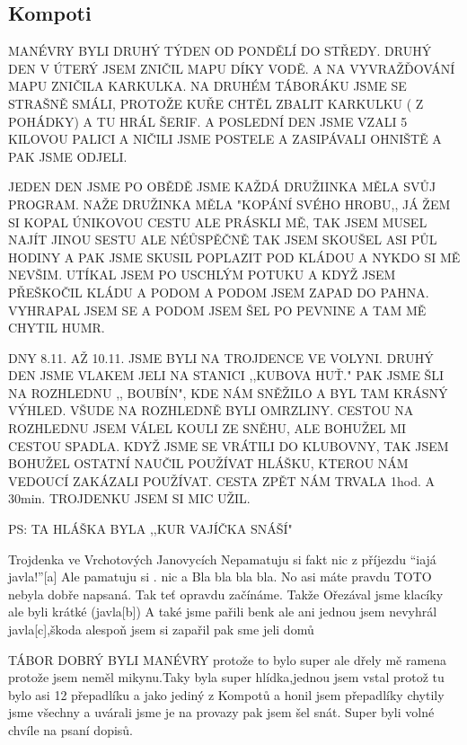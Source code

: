\subsection*{Kompoti} %
\label{sub:kompoti}


\begin{multicols}{2}


MANÉVRY BYLI DRUHÝ TÝDEN OD PONDĚLÍ DO STŘEDY. DRUHÝ DEN V ÚTERÝ JSEM ZNIČIL MAPU DÍKY VODĚ. A NA VYVRAŽĎOVÁNÍ MAPU ZNIČILA KARKULKA. NA DRUHÉM TÁBORÁKU JSME SE STRAŠNĚ SMÁLI, PROTOŽE KUŘE CHTĚL ZBALIT KARKULKU ( Z POHÁDKY) A TU HRÁL ŠERIF. A POSLEDNÍ DEN JSME VZALI 5 KILOVOU PALICI A NIČILI JSME POSTELE A ZASIPÁVALI OHNIŠTĚ A PAK JSME ODJELI.




JEDEN DEN JSME PO OBĚDĚ JSME KAŽDÁ DRUŽIINKA MĚLA SVŮJ PROGRAM. NAŽE DRUŽINKA MĚLA "KOPÁNÍ SVÉHO HROBU,,
JÁ ŽEM SI KOPAL ÚNIKOVOU CESTU ALE PRÁSKLI MĚ, TAK JSEM MUSEL NAJÍT JINOU SESTU ALE NÉŮSPĚČNĚ TAK JSEM SKOUŠEL ASI PŮL HODINY A PAK JSME SKUSIL POPLAZIT POD KLÁDOU A NYKDO SI MĚ NEVŠIM. UTÍKAL JSEM PO USCHLÝM POTUKU A KDYŽ JSEM PŘEŠKOČIL KLÁDU A PODOM A PODOM JSEM ZAPAD DO PAHNA. VYHRAPAL JSEM SE A PODOM JSEM ŠEL PO PEVNINE A TAM MĚ CHYTIL HUMR.




DNY 8.11. AŽ 10.11. JSME BYLI NA TROJDENCE VE VOLYNI. DRUHÝ DEN JSME VLAKEM JELI NA STANICI ,,KUBOVA HUŤ." PAK JSME ŠLI NA ROZHLEDNU ,, BOUBÍN", KDE NÁM SNĚŽILO A BYL TAM KRÁSNÝ VÝHLED. VŠUDE NA ROZHLEDNĚ BYLI OMRZLINY. CESTOU NA ROZHLEDNU JSEM VÁLEL KOULI ZE SNĚHU, ALE BOHUŽEL MI CESTOU SPADLA. KDYŽ JSME SE VRÁTILI DO KLUBOVNY, TAK JSEM BOHUŽEL OSTATNÍ NAUČIL POUŽÍVAT HLÁŠKU, KTEROU NÁM VEDOUCÍ ZAKÁZALI POUŽÍVAT. CESTA ZPĚT NÁM TRVALA 1hod. A 30min. TROJDENKU JSEM SI MIC UŽIL.


PS: TA HLÁŠKA BYLA ,,KUR VAJÍČKA SNÁŠÍ"





Trojdenka ve Vrchotových Janovycích
Nepamatuju si fakt nic z příjezdu “iajá javla!”[a] 
Ale pamatuju si . nic a Bla bla bla bla. No asi máte pravdu TOTO nebyla dobře napsaná. Tak teť opravdu začínáme. Takže Ořezával jsme klacíky ale byli krátké (javla[b]) A také jsme pařili benk ale ani jednou jsem nevyhrál javla[c],škoda alespoň jsem si zapařil pak sme jeli domů




TÁBOR
DOBRÝ BYLI MANÉVRY protože to bylo super ale dřely mě ramena protože jsem neměl mikynu.Taky byla super hlídka,jednou jsem vstal protož tu bylo asi 12 přepadlíku a jako jediný z Kompotů a honil jsem přepadlíky chytily jsme všechny a uvárali jsme je na provazy pak jsem šel snát. Super byli volné chvíle na psaní dopisů.



\end{multicols}
